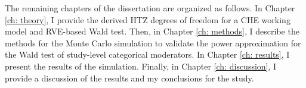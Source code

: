 The remaining chapters of the dissertation are organized as follows. In Chapter \ref{ch: theory}, I provide the derived HTZ degrees of freedom for a CHE working model and RVE-based Wald test. Then, in Chapter \ref{ch: methods}, I describe the methods for the Monte Carlo simulation to validate the power approximation for the Wald test of study-level categorical moderators. In Chapter \ref{ch: results}, I present the results of the simulation. Finally, in Chapter \ref{ch: discussion}, I provide a discussion of the results and my conclusions for the study.  

